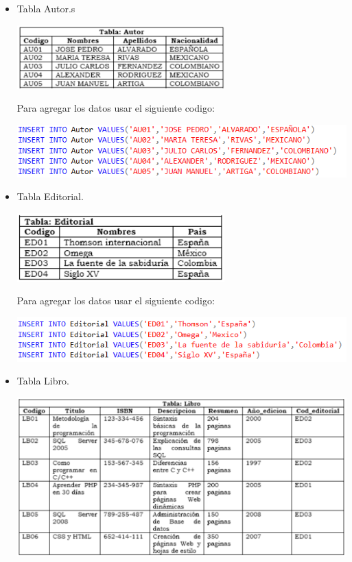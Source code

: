 \documentclass[12pt,letterpaper]{article}
\newcommand\tab[1][1cm]{\hspace*{#1}}
\begin{document}
\begin{enumerate}[\tab 1.]
        \begin{itemize}
            \item Tabla Autor.s
            \begin{center}
                \includegraphics[width=8cm]{./img/img2.png}
            \end{center}
            Para agregar los datos usar el siguiente codigo:
            \begin{center}
                \includegraphics[width=13cm]{./img/img2.1.png}
            \end{center}
            \item Tabla Editorial.
            \begin{center}
                \includegraphics[width=8cm]{./img/img3.png}
            \end{center}
            Para agregar los datos usar el siguiente codigo:
            \begin{center}
                \includegraphics[width=13cm]{./img/img3.1.png}
            \end{center}
            \item Tabla Libro.
            \begin{center}
                \includegraphics[width=13cm]{./img/img4.png}

\end{center}
\end{itemize}
\end{enumerate}
\end{document}
